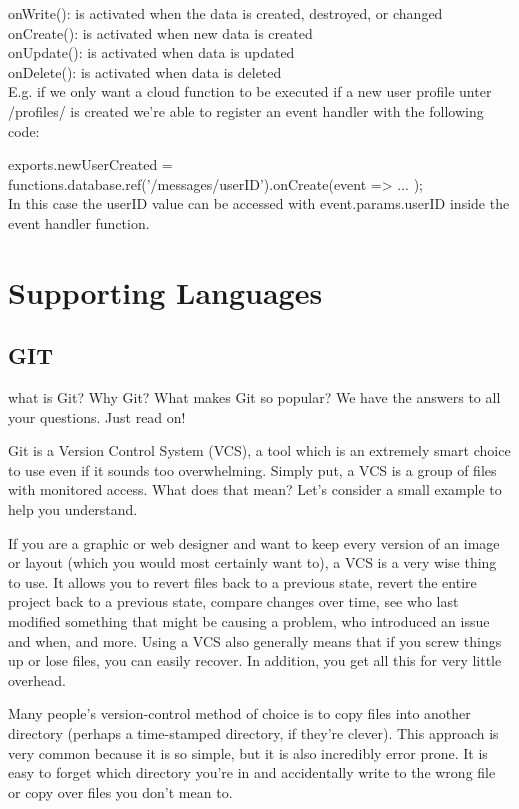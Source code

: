 onWrite(): is activated when the data is created, destroyed, or changed\\
onCreate(): is activated when new data is created\\
onUpdate(): is activated when data is updated\\
onDelete(): is activated when data is deleted\\
E.g. if we only want a cloud function to be executed if a new user profile unter /profiles/ is created we’re able to register an event handler with the following code:

exports.newUserCreated = functions.database.ref('/messages/{userID}').onCreate(event => { ... });\\
In this case the userID value can be accessed with event.params.userID inside the event handler function.

\section{Supporting Languages}

	\subsection{GIT}
	what is Git? Why Git? What makes Git so popular? We have the answers to all your questions. Just read on!
	
	Git is a Version Control System (VCS), a tool which is an extremely smart choice to use even if it sounds too overwhelming. Simply put, a VCS is a group of files with monitored access. What does that mean? Let's consider a small example to help you understand.
	
	If you are a graphic or web designer and want to keep every version of an image or layout (which you would most certainly want to), a VCS is a very wise thing to use. It allows you to revert files back to a previous state, revert the entire project back to a previous state, compare changes over time, see who last modified something that might be causing a problem, who introduced an issue and when, and more. Using a VCS also generally means that if you screw things up or lose files, you can easily recover. In addition, you get all this for very little overhead.
	
	Many people's version-control method of choice is to copy files into another directory (perhaps a time-stamped directory, if they're clever). This approach is very common because it is so simple, but it is also incredibly error prone. It is easy to forget which directory you're in and accidentally write to the wrong file or copy over files you don't mean to.
